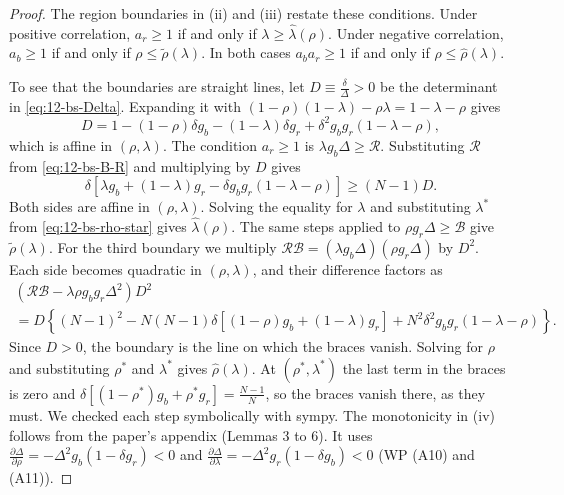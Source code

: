 \begin{proof}
The region boundaries in (ii) and (iii) restate these conditions. Under positive correlation, $a_r \ge 1$ if and only
if $\lambda \ge \hat\lambda(\rho)$. Under negative correlation, $a_b \ge 1$ if and only if $\rho \le \tilde\rho(\lambda)$. In both cases
$a_ba_r \ge 1$ if and only if $\rho \le \hat\rho(\lambda)$.

To see that the boundaries are straight lines, let $D \equiv \frac{\delta}{\Delta} > 0$ be the determinant in
\eqref{eq:12-bs-Delta}. Expanding it with $(1-\rho)(1-\lambda) - \rho\lambda = 1 - \lambda - \rho$ gives
\begin{equation*}
D = 1 - (1-\rho)\delta g_b - (1-\lambda)\delta g_r + \delta^2 g_b g_r(1 - \lambda - \rho),
\end{equation*}
which is affine in $(\rho, \lambda)$. The condition $a_r \ge 1$ is $\lambda g_b\Delta \ge \mathcal R$. Substituting
$\mathcal R$ from \eqref{eq:12-bs-B-R} and multiplying by $D$ gives
\begin{equation*}
\delta\left[\lambda g_b + (1-\lambda)g_r - \delta g_b g_r(1-\lambda-\rho)\right] \ge (N-1)D .
\end{equation*}
Both sides are affine in $(\rho, \lambda)$. Solving the equality for $\lambda$ and substituting $\lambda^*$ from
\eqref{eq:12-bs-rho-star} gives $\hat\lambda(\rho)$. The same steps applied to $\rho g_r\Delta \ge \mathcal B$ give
$\tilde\rho(\lambda)$. For the third boundary we multiply $\mathcal R\mathcal B = (\lambda g_b\Delta)(\rho g_r\Delta)$
by $D^2$. Each side becomes quadratic in $(\rho, \lambda)$, and their difference factors as
\begin{multline*}
\left(\mathcal R\mathcal B - \lambda\rho g_b g_r\Delta^2\right)D^2\\
= D\left\{(N-1)^2 - N(N-1)\delta\left[(1-\rho)g_b + (1-\lambda)g_r\right] + N^2\delta^2 g_b g_r(1 - \lambda - \rho)\right\}.
\end{multline*}
Since $D > 0$, the boundary is the line on which the braces vanish. Solving for $\rho$ and substituting $\rho^*$ and
$\lambda^*$ gives $\hat\rho(\lambda)$. At $(\rho^*, \lambda^*)$ the last term in the braces is zero and
$\delta\left[(1-\rho^*)g_b + \rho^* g_r\right] = \frac{N-1}{N}$, so the braces vanish there, as they must. We checked
each step symbolically with sympy. The monotonicity in (iv) follows from the paper's appendix (Lemmas 3 to 6). It uses
$\frac{\partial\Delta}{\partial\rho} = -\Delta^2 g_b(1 - \delta g_r) < 0$ and
$\frac{\partial\Delta}{\partial\lambda} = -\Delta^2 g_r(1 - \delta g_b) < 0$ (WP (A10) and (A11)).
\end{proof}


